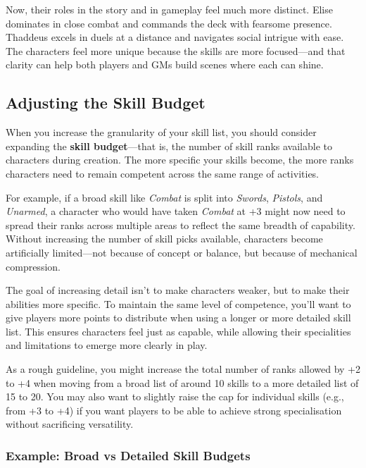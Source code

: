 Now, their roles in the story and in gameplay feel much more distinct. Elise dominates in close combat and commands the deck with fearsome presence. Thaddeus excels in duels at a distance and navigates social intrigue with ease. The characters feel more unique because the skills are more focused—and that clarity can help both players and GMs build scenes where each can shine.


\subsection{Adjusting the Skill Budget}

When you increase the granularity of your skill list, you should consider expanding the \textbf{skill budget}—that is, the number of skill ranks available to characters during creation. The more specific your skills become, the more ranks characters need to remain competent across the same range of activities.

For example, if a broad skill like \textit{Combat} is split into \textit{Swords}, \textit{Pistols}, and \textit{Unarmed}, a character who would have taken \textit{Combat} at +3 might now need to spread their ranks across multiple areas to reflect the same breadth of capability. Without increasing the number of skill picks available, characters become artificially limited—not because of concept or balance, but because of mechanical compression.

The goal of increasing detail isn’t to make characters weaker, but to make their abilities more specific. To maintain the same level of competence, you’ll want to give players more points to distribute when using a longer or more detailed skill list. This ensures characters feel just as capable, while allowing their specialities and limitations to emerge more clearly in play.

As a rough guideline, you might increase the total number of ranks allowed by +2 to +4 when moving from a broad list of around 10 skills to a more detailed list of 15 to 20. You may also want to slightly raise the cap for individual skills (e.g., from +3 to +4) if you want players to be able to achieve strong specialisation without sacrificing versatility.

\subsubsection{Example: Broad vs Detailed Skill Budgets}

